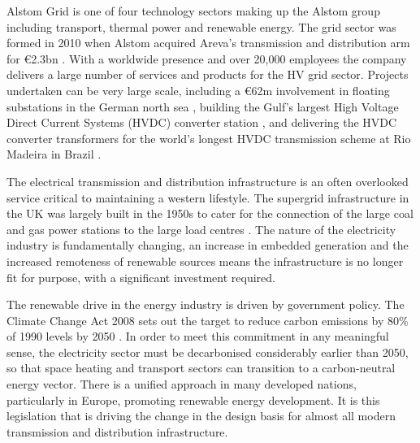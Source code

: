 {}
Alstom Grid is one of four technology sectors making up the Alstom group including transport, thermal power and renewable energy. 
The grid sector was formed in 2010 when Alstom acquired Areva's transmission and distribution arm \cite{AlstomGridInfo} for \euro2.3bn \cite{AlstomAreva}. 
With a worldwide presence and over 20,000 employees \cite{AlstomGridInfo} the company delivers a large number of services and products for the HV grid sector.
Projects undertaken can be very large scale, including a \euro62m involvement in floating substations in the German north sea \cite{AlstomGridInfo}, building the Gulf's largest High Voltage Direct Current Systems (HVDC) converter station \cite{AlstomGulf}, and delivering the HVDC converter transformers for the world's longest HVDC transmission scheme at Rio Madeira in Brazil \cite{AlstomRio}.

The electrical transmission and distribution infrastructure is an often overlooked service critical to maintaining a western lifestyle.
The supergrid infrastructure in the UK was largely built in the 1950s to cater for the connection of the large coal and gas power stations to the large load centres \cite{NationalGrid75}.
The nature of the electricity industry is fundamentally changing, an increase in embedded generation and the increased remoteness of renewable sources means the infrastructure is no longer fit for purpose, with a significant investment required.

The renewable drive in the energy industry is driven by government policy.
The Climate Change Act 2008 sets out the target to reduce carbon emissions by 80\% of 1990 levels by 2050 \cite{ClimateChangeAct08}.
In order to meet this commitment in any meaningful sense, the electricity sector must be decarbonised considerably earlier than 2050, so that space heating and transport sectors can transition to a carbon-neutral energy vector.
There is a unified approach in many developed nations, particularly in Europe, promoting renewable energy development.
It is this legislation that is driving the change in the design basis for almost all modern transmission and distribution infrastructure.

